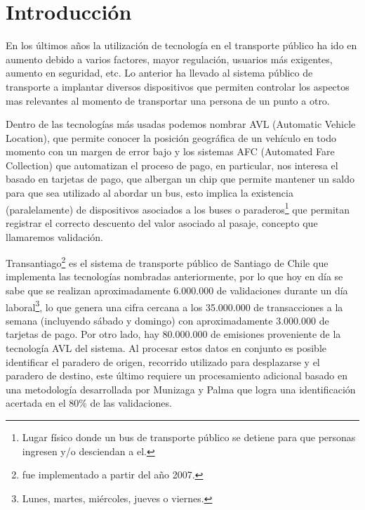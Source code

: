 \documentclass[itshape,12pt]{article}
\begin{document}


              \newpage



          \newpage
              \section{Introducción}


              En los últimos años la utilización de tecnología en el transporte público ha ido en aumento debido a varios factores, mayor regulación, usuarios más exigentes, aumento en seguridad, etc. Lo anterior ha llevado al sistema público de transporte a implantar diversos dispositivos que permiten controlar los aspectos mas relevantes al momento de transportar una persona de un punto a otro.

              Dentro de las tecnologías más usadas podemos nombrar AVL (Automatic Vehicle Location), que permite conocer la posición geográfica de un vehículo en todo momento con un margen de error bajo y los sistemas AFC (Automated Fare Collection) que automatizan el proceso de pago, en particular, nos interesa el basado en tarjetas de pago, que albergan un chip que permite mantener un saldo para que sea utilizado al abordar un bus, esto implica la existencia (paralelamente) de dispositivos asociados a los buses o paraderos\footnote{Lugar físico donde un bus de transporte público se detiene para que personas ingresen y/o desciendan a el.} que permitan registrar el correcto descuento del valor asociado al pasaje, concepto que llamaremos validación.

              Transantiago\footnote{fue implementado a partir del año 2007.} es el sistema de transporte público de Santiago de Chile que implementa las tecnologías nombradas anteriormente, por lo que hoy en día se sabe que se realizan aproximadamente 6.000.000 de validaciones durante un día laboral\footnote{Lunes, martes, miércoles, jueves o viernes.}, lo que genera una cifra cercana a los 35.000.000 de transacciones a la semana (incluyendo sábado y domingo) con aproximadamente 3.000.000 de tarjetas de pago. Por otro lado, hay 80.000.000 de emisiones proveniente de la tecnología AVL del sistema. Al procesar estos datos en conjunto es posible identificar el paradero de origen, recorrido utilizado para desplazarse y el paradero de destino, este último requiere un procesamiento adicional basado en una metodología desarrollada por Munizaga y Palma \cite{Procesamiento_datos} que logra una identificación acertada en el 80\% de las validaciones.
\end{document}
